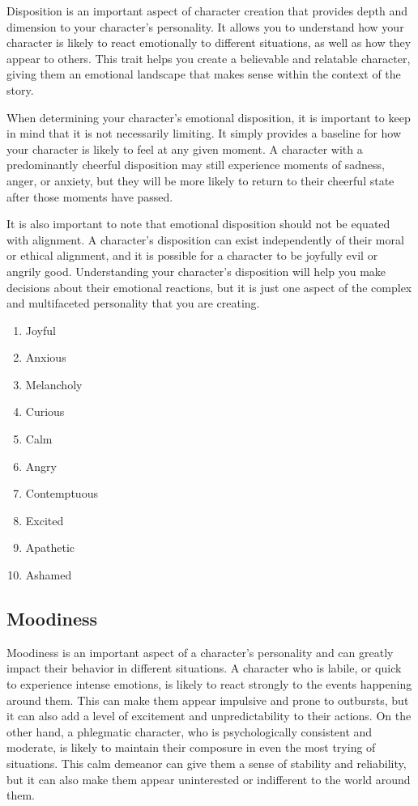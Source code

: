 \documentclass[12pt]{book}  %
\begin{document}
Disposition is an important aspect of character creation that provides depth and dimension to your character's personality. It allows you to understand how your character is likely to react emotionally to different situations, as well as how they appear to others. This trait helps you create a believable and relatable character, giving them an emotional landscape that makes sense within the context of the story.

When determining your character's emotional disposition, it is important to keep in mind that it is not necessarily limiting. It simply provides a baseline for how your character is likely to feel at any given moment. A character with a predominantly cheerful disposition may still experience moments of sadness, anger, or anxiety, but they will be more likely to return to their cheerful state after those moments have passed.

It is also important to note that emotional disposition should not be equated with alignment. A character's disposition can exist independently of their moral or ethical alignment, and it is possible for a character to be joyfully evil or angrily good. Understanding your character's disposition will help you make decisions about their emotional reactions, but it is just one aspect of the complex and multifaceted personality that you are creating.

\begin{enumerate}
    \item Joyful
    \item Anxious
    \item Melancholy
    \item Curious
    \item Calm
    \item Angry
    \item Contemptuous
    \item Excited
    \item Apathetic
    \item Ashamed
\end{enumerate}

\subsection{\textbf{Moodiness}}

Moodiness is an important aspect of a character's personality and can greatly impact their behavior in different situations. A character who is labile, or quick to experience intense emotions, is likely to react strongly to the events happening around them. This can make them appear impulsive and prone to outbursts, but it can also add a level of excitement and unpredictability to their actions. On the other hand, a phlegmatic character, who is psychologically consistent and moderate, is likely to maintain their composure in even the most trying of situations. This calm demeanor can give them a sense of stability and reliability, but it can also make them appear uninterested or indifferent to the world around them.
\end{document}
